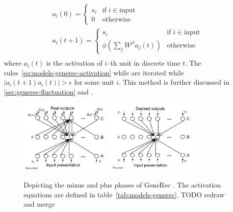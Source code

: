 \begin{align}
  \label{eq:models-generec-activation}
  a_i(0) = \left\{
	\begin{array}{ll}
		s_i & \mbox{if } i \in \mbox{input} \nonumber \\
		0 & \mbox{otherwise} \nonumber 
	\end{array}
\right. \\
  a_i(t+1) = \left\{
	\begin{array}{ll}
		s_i & \mbox{if } i \in \mbox{input} \nonumber \\
		\phi(\sum_j W^{ji}a_j(t)) & \mbox{otherwise} \nonumber 
	\end{array}
\right. \\
\end{align} 
where $a_i(t)$ is the activation of $i$--th unit in discrete time $t$. The rules~\ref{eq:models-generec-activation} while are iterated while $|a_i(t+1) a_i(t)| > \epsilon$ for some unit $i$. This method is further discussed in \ref{sec:generec-fluctuation} and \citep{orru2008sabio}.

\begin{figure}[h]
  \centering
  \includegraphics[width=0.4\textwidth]{img/generec_minus_phase.png}
  \includegraphics[width=0.4\textwidth]{img/generec_plus_phase.png}
  \caption{Depicting the minus and plus phases of GeneRec \citet{orru2008sabio}. The activation equations are defined in table~\ref{tab:models-generec}. TODO redraw and merge} 
  \label{fig:models-generec-phase}
\end{figure}


